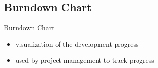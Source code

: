 \subsection{Burndown Chart}
\begin{frame}{\insertsubsection}
	\begin{fancycolumns}[widths={75}]
		\begin{exampletight}{}
		\end{exampletight}
	\nextcolumn
		\begin{definition}{Burndown Chart}
			\begin{itemize}
				\item visualization of the development progress
				\item used by project management to track progress
			\end{itemize}
		\end{definition}
	\end{fancycolumns}
\end{frame}

